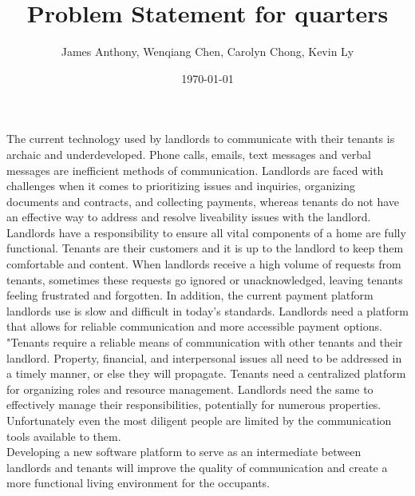 \documentclass[12pt]{article}
\begin{document}
\title{Problem Statement for quarters} 
\author{James Anthony, Wenqiang Chen, Carolyn Chong, Kevin Ly}
\date{\today}
	
\maketitle

The current technology used by landlords to communicate with their tenants is 
archaic and underdeveloped. Phone calls, emails, text messages and verbal 
messages are inefficient methods of communication. Landlords are faced with 
challenges when it comes to prioritizing issues and inquiries, organizing 
documents and contracts, and collecting payments, whereas tenants do not have an 
effective way to address and resolve liveability issues with the landlord. \\

Landlords have a responsibility to ensure all vital components of a home are 
fully functional. Tenants are their customers and it is up to the landlord to 
keep them comfortable and content. When landlords receive a high volume of 
requests from tenants, sometimes these requests go ignored or unacknowledged, 
leaving tenants feeling 
frustrated and forgotten. 
In addition, the current payment platform landlords use is slow and difficult 
in today's standards. 
Landlords need a platform that allows for reliable communication and more 
accessible payment options. \\

"Tenants require a reliable means of communication with other tenants and their 
landlord. Property, financial, and interpersonal issues all need to be addressed 
in a timely manner, or else they will propagate. Tenants need a centralized 
platform for organizing roles and resource management. Landlords need the same 
to effectively manage their responsibilities, potentially for numerous properties. 
Unfortunately even the most diligent people are limited by the communication tools 
available to them. \\

Developing a new software platform to serve as an intermediate between 
landlords and tenants will improve the quality of communication 
and create a more functional living environment for the occupants.
\end{document}

